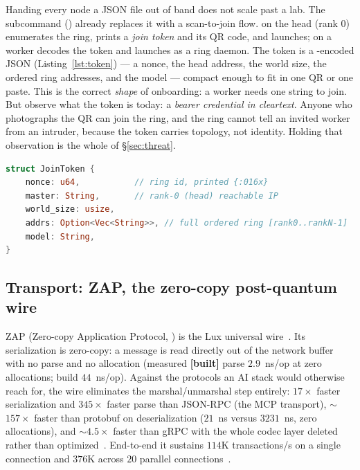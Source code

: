 \documentclass[11pt]{article}
\newcommand{\built}{\textcolor{str}{\small\textbf{[built]}}}
\begin{document}
Handing every node a JSON file out of band does not scale past a lab. The 
subcommand () already replaces it with a scan-to-join flow.
 on the head (rank 0) enumerates the ring, prints a \emph{join token}
and its QR code, and launches;  on a worker decodes the token and
launches as a ring daemon. The token is a -encoded JSON 
(Listing~\ref{lst:token}) --- a nonce, the head address, the world size, the ordered ring
addresses, and the model --- compact enough to fit in one QR or one paste. This is the correct
\emph{shape} of onboarding: a worker needs one string to join. But observe what the token is
today: a \emph{bearer credential in cleartext}. Anyone who photographs the QR can join the ring,
and the ring cannot tell an invited worker from an intruder, because the token carries topology,
not identity. Holding that observation is the whole of \S\ref{sec:threat}.

\begin{lstlisting}[language=Rust,caption={The join token (\code{hanzo-cli/src/cluster.rs}):
\code{bs58(JSON)} so it fits one QR. It is topology, not identity --- a bearer secret today.},label={lst:token}]
struct JoinToken {
    nonce: u64,           // ring id, printed {:016x}
    master: String,       // rank-0 (head) reachable IP
    world_size: usize,
    addrs: Option<Vec<String>>, // full ordered ring [rank0..rankN-1]
    model: String,
}
\end{lstlisting}

\subsection{Transport: ZAP, the zero-copy post-quantum wire}
\label{sec:zap}

ZAP (Zero-copy Application Protocol, ) is the Lux universal
wire~\cite{zap,lp201}. Its serialization is zero-copy: a message is read directly out of the
network buffer with no parse and no allocation (measured \built{} parse $2.9$~ns/op at zero
allocations; build $44$~ns/op). Against the protocols an AI stack would otherwise reach for,
the wire eliminates the marshal/unmarshal step entirely: $17\times$ faster serialization and
$345\times$ faster parse than JSON-RPC (the MCP transport), $\sim$$157\times$ faster than
protobuf on deserialization ($21$~ns versus $3231$~ns, zero allocations), and $\sim$$4.5\times$
faster than gRPC with the whole codec layer deleted rather than optimized~\cite{zap,lp201,luxconsensus}.
End-to-end it sustains $114$K transactions/s on a single connection and $376$K across $20$
parallel connections~\cite{luxconsensus}.
\end{document}
